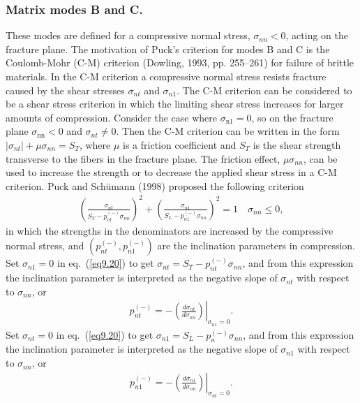 \documentclass{AeroStructure-ERJohnson}
\begin{document}
\subsubsection{Matrix modes B and C.}\quad These modes are defined for a compressive normal stress, $\sigma_\textit{nn} < 0$, acting on the fracture plane. The motivation of Puck's criterion for modes B and C is the Coulomb-Mohr (C-M) criterion (Dowling, 1993, pp. 255--261) for failure of brittle materials. In the C-M criterion a compressive normal stress resists fracture caused by the shear stresses $\sigma_\textit{nt}$ and $\sigma_{n1}$. The C-M criterion can be considered to be a shear stress criterion in which the limiting shear stress increases for larger amounts of compression. Consider the case where $\sigma_{\textrm{n1}} = 0$, so on the fracture plane $\sigma_{\textrm{nn}} < 0$ and $\sigma_{n t}\neq 0$. Then the C-M criterion can be written in the form $\left|\sigma_{n t}\right|+\mu \sigma_{n n}=S_{T}$, where $\mu$ is a friction coefficient and $S_T$ is the shear strength transverse to the fibers in the fracture plane. The friction effect, $\mu \sigma_{n n}$, can be used to increase the strength or to decrease the applied shear stress in a C-M criterion. Puck and Sch\"{u}mann (1998) proposed the following criterion
\begin{align}\label{eq9.20}
\left(\frac{\sigma_{n t}}{S_{T}-p_{n t}^{(-)} \sigma_{n n}}\right)^{2}+\left(\frac{\sigma_{n 1}}{S_{L}-p_{n 1}^{(-)} \sigma_{n n}}\right)^{2}=1 \quad \sigma_{n n} \leq 0,
\end{align}
in which the strengths in the denominators are increased by the compressive normal stress, and $\left(p_{n t}^{(-)}, p_{n 1}^{(-)}\right)$ are the inclination parameters in compression. Set $\sigma_{n1} = 0$ in eq.~(\ref{eq9.20}) to get $\sigma_{n t}=S_{T}-p_{n t}^{(-)} \sigma_{nn}$, and from this expression the inclination parameter is interpreted as the negative slope of $\sigma_\textit{nt}$ with respect to $\sigma_\textit{nn}$, or
\begin{align}\label{eq9.21}
p_{n t}^{(-)}=-\left.\left(\frac{d \sigma_{n t}}{d \sigma_{n n}}\right)\right|_{\sigma_{n 1}=0}.
\end{align}
Set $\sigma_\textit{nt} = 0$ in eq.~(\ref{eq9.20}) to get $\sigma_{n 1}=S_{L}-p_{n}^{(-)} \sigma_{n n}$, and from this expression the inclination parameter is interpreted as the negative slope of $\sigma_{n1}$ with respect to $\sigma_\textit{nn}$, or
\begin{align}\label{eq9.22}
p_{n 1}^{(-)}=-\left.\left(\frac{d \sigma_{n 1}}{d \sigma_{n n}}\right)\right|_{\sigma_{n t}=0}.
\end{align}
\end{document}
